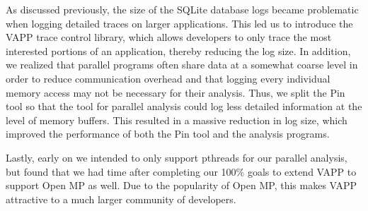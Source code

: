 As discussed previously, the size of the SQLite database logs became
problematic when logging detailed traces on larger applications.  This
led us to introduce the VAPP trace control library, which allows
developers to only trace the most interested portions of an
application, thereby reducing the log size.  In addition, we realized
that parallel programs often share data at a somewhat coarse level in
order to reduce communication overhead and that logging every
individual memory access may not be necessary for their analysis.
Thus, we split the Pin tool so that the tool for parallel analysis
could log less detailed information at the level of memory buffers.
This resulted in a massive reduction in log size, which improved the
performance of both the Pin tool and the analysis programs.

Lastly, early on we intended to only support pthreads for our parallel
analysis, but found that we had time after completing our 100\% goals
to extend VAPP to support Open MP as well. Due to the popularity of
Open MP, this makes VAPP attractive to a much larger community of
developers. 


